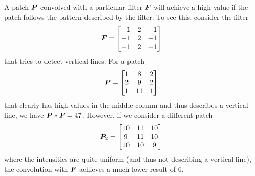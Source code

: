 \documentclass[../report.tex]{subfiles}
\begin{document}
A patch ${\bm{P}}$ convolved with a particular filter ${\bm{F}}$ will achieve a high value if the patch follows the pattern described by the filter.
To see this, consider the filter
\begin{equation*}
    {\bm{F}} = \begin{bmatrix}
        -1 & 2 & -1 \\
        -1 & 2 & -1 \\
        -1 & 2 & -1
    \end{bmatrix}
\end{equation*}
that tries to detect vertical lines.
For a patch
\begin{equation*}
    {\bm{P}} = \begin{bmatrix}
        1 & 8 & 2 \\
        2 & 9 & 2 \\
        1 & 11 & 1
    \end{bmatrix}
\end{equation*}
that clearly has high values in the middle column and thus describes a vertical line, 
we have ${\bm{P}} * {\bm{F}} = 47$. However, if we consider a different patch
\begin{equation*}
    {\bm{P}}_2 = \begin{bmatrix}
        10 & 11 & 10 \\
        9 & 11 & 10 \\
        10 & 10 & 9
    \end{bmatrix}
\end{equation*}
where the intensities are quite uniform (and thus not describing a vertical line), the convolution with ${\bm{F}}$ achieves a much lower result of $6$.
\end{document}

